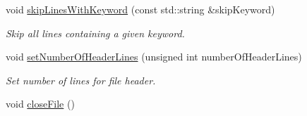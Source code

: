 \begin{DoxyCompactItemize}
void \hyperlink{classtudat_1_1input__output_1_1TwoLineElementsTextFileReader_a628d1f55f388c393744abd4cf23da025}{skip\+Lines\+With\+Keyword} (const std\+::string \&skip\+Keyword)
\begin{DoxyCompactList}\small\item\em Skip all lines containing a given keyword. \end{DoxyCompactList}\item 
void \hyperlink{classtudat_1_1input__output_1_1TwoLineElementsTextFileReader_a3f8b95ee6f8104c29a7f72b0e596eb0a}{set\+Number\+Of\+Header\+Lines} (unsigned int number\+Of\+Header\+Lines)
\begin{DoxyCompactList}\small\item\em Set number of lines for file header. \end{DoxyCompactList}\item 
void \hyperlink{classtudat_1_1input__output_1_1TwoLineElementsTextFileReader_aaa80dbd1c638c2dceda534f716393f53}{close\+File} ()\hypertarget{classtudat_1_1input__output_1_1TwoLineElementsTextFileReader_aaa80dbd1c638c2dceda534f716393f53}{}\label{classtudat_1_1input__output_1_1TwoLineElementsTextFileReader_aaa80dbd1c638c2dceda534f716393f53}


\end{DoxyCompactItemize}
